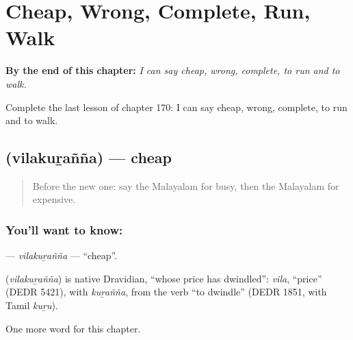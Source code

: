 
\chapter{Cheap, Wrong, Complete, Run, Walk}
\label{ch:ml-cheap-wrong-complete-run-walk}

\begin{chapteropening}
\textbf{By the end of this chapter:} \emph{I can say cheap, wrong, complete, to run and to walk.}

Complete the last lesson of chapter 170: I can say cheap, wrong, complete, to run and to walk.
\end{chapteropening}

\section[\texorpdfstring{\ml{വിലകുറഞ്ഞ} (vilakuṟañña)}{വിലകുറഞ്ഞ (vilakuṟañña)}]{ (vilakuṟañña) — cheap}

\label{lesson:ML-C170-vilakuranna}



\begin{quote}
Before the new one: say the Malayalam for busy, then the Malayalam for expensive.
\end{quote}

\subsection*{You'll want to know: }
\textbf{} — \emph{vilakuṟañña} — \textquotedblleft{}cheap\textquotedblright{}.

\begin{cousinweb}
\textbf{} (\emph{vilakuṟañña}) is native Dravidian, \textquotedblleft{}whose price has dwindled\textquotedblright{}: \emph{vila}, \textquotedblleft{}price\textquotedblright{} (DEDR 5421), with \emph{kuṟañña}, from the verb \textquotedblleft{}to dwindle\textquotedblright{} (DEDR 1851, with Tamil \emph{kuṟu}).
\end{cousinweb}

\begin{grammarlens}[title={What you've built}]
One more word for this chapter.
\end{grammarlens}

